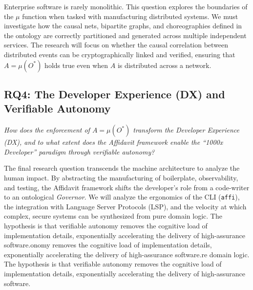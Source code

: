 Enterprise software is rarely monolithic. This question explores the boundaries of the $\mu$ function when tasked with manufacturing distributed systems. We must investigate how the causal nets, bipartite graphs, and choreographies defined in the ontology are correctly partitioned and generated across multiple independent services. The research will focus on whether the causal correlation between distributed events can be cryptographically linked and verified, ensuring that $A = \mu(O^*)$ holds true even when $A$ is distributed across a network.

\subsection{RQ4: The Developer Experience (DX) and Verifiable Autonomy}
\textit{How does the enforcement of $A = \mu(O^*)$ transform the Developer Experience (DX), and to what extent does the Affidavit framework enable the ``1000x Developer'' paradigm through verifiable autonomy?}

The final research question transcends the machine architecture to analyze the human impact. By abstracting the manufacturing of boilerplate, observability, and testing, the Affidavit framework shifts the developer's role from a code-writer to an ontological \textit{Governor}. We will analyze the ergonomics of the CLI (\texttt{affi}), the integration with Language Server Protocols (LSP), and the velocity at which complex, secure systems can be synthesized from pure domain logic. The hypothesis is that verifiable autonomy removes the cognitive load of implementation details, exponentially accelerating the delivery of high-assurance software.onomy removes the cognitive load of implementation details, exponentially accelerating the delivery of high-assurance software.re domain logic. The hypothesis is that verifiable autonomy removes the cognitive load of implementation details, exponentially accelerating the delivery of high-assurance software.